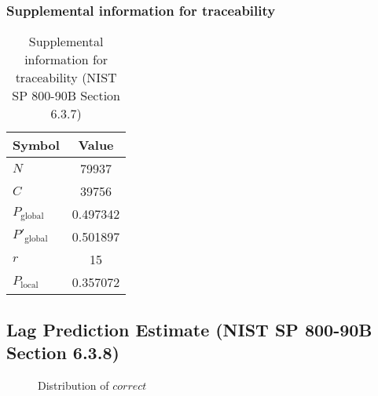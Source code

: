 \documentclass[a3paper,xelatex,english]{bxjsarticle}
\begin{document}
\subsubsection{Supplemental information for traceability}
\renewcommand{\arraystretch}{1.8}
\begin{table}[h]
\caption{Supplemental information for traceability (NIST SP 800-90B Section 6.3.7)}
\begin{center}
\begin{tabular}{|l|c|}
\hline 
\rowcolor{anotherlightblue} %
Symbol				& Value \\ \hline 
$N$				& 79937\\ \hline 
$C$				& 39756\\ \hline 
$P_{\textrm{global}}$				& 0.497342\\ \hline 
$P'_{\textrm{global}}$			& 0.501897\\ \hline 
$r$				& 15\\ \hline 
$P_{\textrm{local}}$ 			& 0.357072\\ \hline
\end{tabular}
\end{center}
\end{table}
\renewcommand{\arraystretch}{1.4}
\clearpage
\subsection{Lag Prediction Estimate (NIST SP 800-90B Section 6.3.8)}
\begin{figure}[htbp]
\caption{Distribution of $correct$}
\end{figure}
\end{document}
